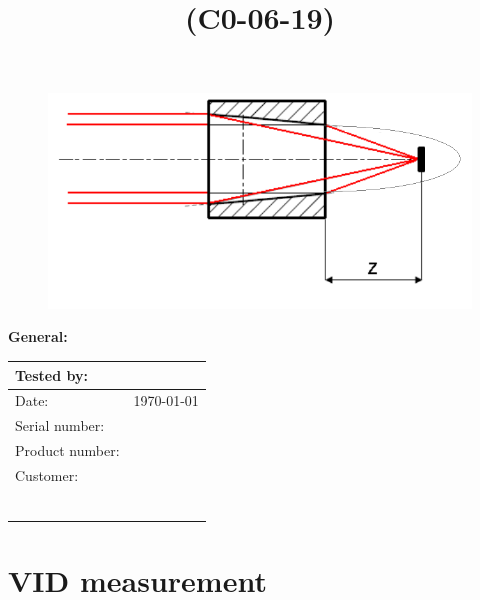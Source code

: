 \documentclass{article}
\title{\textbf{\textcolor{ultramarine}{\Optics{} (C0-06-19)}}}
\date{\textbf{\textcolor{ultramarine}{\ReportName{}}}}
\newcommand{\SerialNumber}{\text{037}}
\newcommand{\Optics}{\text{037-066}}
\newcommand{\Author}{\text{Veronika Marsikova}}
\newcommand{\Customer}{\text{BRU}}
\begin{document}
 \maketitle
 \thispagestyle{fancy} %
\captionsetup[subfigure]{singlelinecheck=off, justification=centering}

\begin{figure}[ht]
    \begin{center}
    \includegraphics[width= 7 cm]{optics_parabola.png}
    \end{center}
    \label{fig:optika}
\end{figure}


\textbf{\textcolor{ultramarine}{General:}}\\
\begin{center}
    	\renewcommand{\arraystretch}{1.15} %
    \begin{tabular}{|p{7cm}|p{7cm}|}
\hline
Tested by:&			\Author{}\\	\hline
Date:&				\today\\	\hline
Serial number:&		\SerialNumber{}\\	\hline
Product number:&	\Optics{}\\	\hline
Customer:&			\Customer{}\\
&						\\
&						\\
&						\\
&						\\
&						\\
&						\\
	\hline
    \end{tabular}
\end{center}

\clearpage

\newpage

\section{VID measurement}
\end{document}
